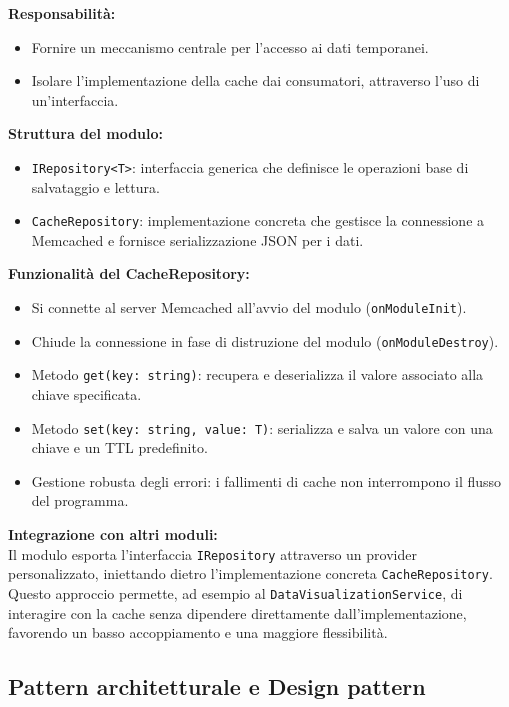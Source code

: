 \textbf{Responsabilità:}
\begin{itemize}
    \item Fornire un meccanismo centrale per l’accesso ai dati temporanei.
    \item Isolare l’implementazione della cache dai consumatori, attraverso l’uso di un’interfaccia.
\end{itemize}

\textbf{Struttura del modulo:}
\begin{itemize}
    \item \texttt{IRepository<T>}: interfaccia generica che definisce le operazioni base di salvataggio e lettura.
    \item \texttt{CacheRepository}: implementazione concreta che gestisce la connessione a Memcached e fornisce serializzazione JSON per i dati.
\end{itemize}

\textbf{Funzionalità del CacheRepository:}
\begin{itemize}
    \item Si connette al server Memcached all’avvio del modulo (\texttt{onModuleInit}).
    \item Chiude la connessione in fase di distruzione del modulo (\texttt{onModuleDestroy}).
    \item Metodo \texttt{get(key: string)}: recupera e deserializza il valore associato alla chiave specificata.
    \item Metodo \texttt{set(key: string, value: T)}: serializza e salva un valore con una chiave e un TTL predefinito.
    \item Gestione robusta degli errori: i fallimenti di cache non interrompono il flusso del programma.
\end{itemize}

\textbf{Integrazione con altri moduli:} \\
Il modulo esporta l’interfaccia \texttt{IRepository} attraverso un provider personalizzato, iniettando dietro l’implementazione concreta \texttt{CacheRepository}. Questo approccio permette, ad esempio al \texttt{DataVisualizationService}, di interagire con la cache senza dipendere direttamente dall’implementazione, favorendo un basso accoppiamento e una maggiore flessibilità.



\subsection{Pattern architetturale e Design pattern}

